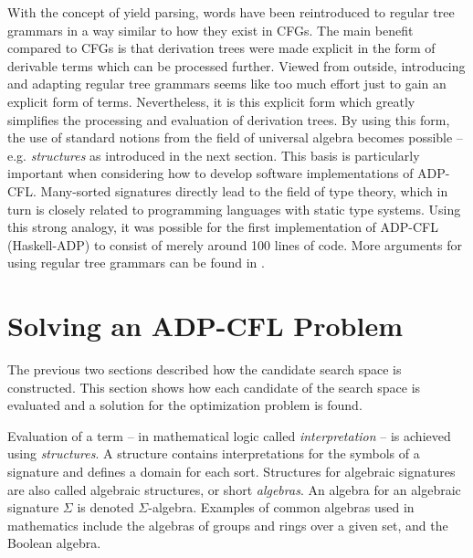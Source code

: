 \documentclass[
    a4paper,
    12pt,
    twoside,
    BCOR=12mm,
    parskip=half,
    chapterprefix,
    numbers=noenddot,
    bibliography=totoc
]{scrbook}
\begin{document}
With the concept of yield parsing, words have been reintroduced to regular tree grammars in a way similar to how they exist in \glspl{CFG}. The main benefit compared to \glspl{CFG} is that derivation trees were made explicit in the form of derivable terms which can be processed further. Viewed from outside, introducing and adapting regular tree grammars seems like too much effort just to gain an explicit form of terms. Nevertheless, it is this explicit form which greatly simplifies the processing and evaluation of derivation trees. By using this form, the use of standard notions from the field of universal algebra becomes possible -- e.g. \emph{structures} as introduced in the next section. This basis is particularly important when considering how to develop software implementations of ADP-CFL. Many-sorted signatures directly lead to the field of type theory, which in turn is closely related to programming languages with static type systems. Using this strong analogy, it was possible for the first implementation of ADP-CFL (Haskell-ADP) to consist of merely around 100 lines of code. More arguments for using regular tree grammars can be found in \citet[sect. 3.10]{giegerich_discipline_2004}.
  
\section{Solving an ADP-CFL Problem}
\label{sec:adp_problem_solution}

The previous two sections described how the candidate search space is constructed. This section shows how each candidate of the search space is evaluated and a solution for the optimization problem is found.

Evaluation of a term -- in mathematical logic called \emph{interpretation} -- is achieved using \emph{structures}. A structure contains interpretations for the symbols of a signature and defines a domain for each sort. Structures for algebraic signatures are also called algebraic structures, or short \emph{algebras}. An algebra for an algebraic signature $\Sigma$ is denoted $\Sigma$-algebra. Examples of common algebras used in mathematics include the algebras of groups and rings over a given set, and the Boolean algebra.
\end{document}
